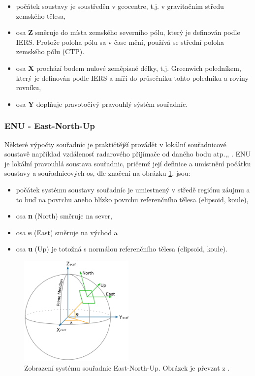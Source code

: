 \documentclass[11pt,a4paper]{article}
\begin{document}
\begin{itemize}
\item počátek soustavy je soustředěn v geocentre, t.j. v gravitačním středu zemského tělesa,
\item osa \textbf{Z} směruje do místa zemského severního pólu, který je definován podle IERS. Protože poloha pólu sa v čase mění, používá se střední poloha zemského pólu (CTP).
\item osa \textbf{X} prochází bodem nulové zeměpisné délky, t.j. Greenwich poledníkem, který je definován podle IERS a míři do průsečníku tohto poledníku a roviny rovníku,
\item osa \textbf{Y} doplňuje pravotočivý pravouhlý sýstém souřadníc.
\end{itemize}

\subsubsection{ENU - East-North-Up}

Některé výpočty souřadníc je praktičtější provádět v lokální souřadnicové soustavě například vzdálenosť radarového přijímače od daného bodu atp.,\cite{Kovar2016}, \cite{Mayer2002}. ENU je lokální pravouhlá soustava souřadnic, pričemž její definice a umístnění počátku soustavy a souřadnicových os, dle značení na obrázku \ref{fig:enu}, jsou:
 
\begin{itemize}
\item počátek systému soustavy souřadníc je umiestnený v středě regiónu záujmu a to  buď na povrchu anebo blízko povrchu referenčního tělesa (elipsoid, koule),
\item osa \textbf{n} (North) směruje na sever, 
\item osa \textbf{e} (East) směruje na východ a 
\item osa \textbf{u} (Up) je totožná s normálou referenčního tělesa (elipsoid, koule). 
\end{itemize}

\begin{figure}[ht!]
\begin{center}

\includegraphics[width=0.50\textwidth]{FIG/enu_wiki}
\caption{Zobrazení systému souřadnic East-North-Up. Obrázek je převzat z \cite{enuWiki}.}
\label{fig:enu}
\end{center}
\end{figure}
\end{document}
